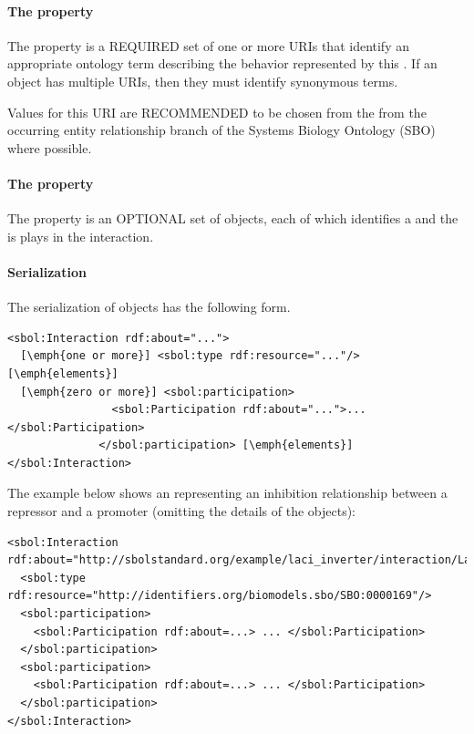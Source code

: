 \paragraph{The  property}\label{sec:types}

The  property is a REQUIRED set of one or more URIs that identify an appropriate ontology term describing the behavior represented by this . 
If an  object has multiple
 URIs, then they must identify synonymous terms.

Values for this URI are RECOMMENDED to be chosen from the from the occurring entity relationship branch of the Systems Biology Ontology (SBO) where possible.


\paragraph{The  property}\label{sec:participations}

The  property is an OPTIONAL set of  objects, each of which identifies a  and the  is plays in the interaction.


\paragraph{Serialization}

The serialization of  objects has the following form.
\begin{lstlisting}
<sbol:Interaction rdf:about="...">
  [\emph{one or more}] <sbol:type rdf:resource="..."/> [\emph{elements}]
  [\emph{zero or more}] <sbol:participation>
                <sbol:Participation rdf:about="...">...</sbol:Participation>
              </sbol:participation> [\emph{elements}]
</sbol:Interaction>
\end{lstlisting}

The example below shows an  representing an inhibition relationship between a repressor and a promoter (omitting the details of the  objects):

\begin{lstlisting}
<sbol:Interaction rdf:about="http://sbolstandard.org/example/laci_inverter/interaction/LacI_pLacI">
  <sbol:type rdf:resource="http://identifiers.org/biomodels.sbo/SBO:0000169"/>
  <sbol:participation>
    <sbol:Participation rdf:about=...> ... </sbol:Participation>
  </sbol:participation>
  <sbol:participation>
    <sbol:Participation rdf:about=...> ... </sbol:Participation>
  </sbol:participation>
</sbol:Interaction>
\end{lstlisting}


